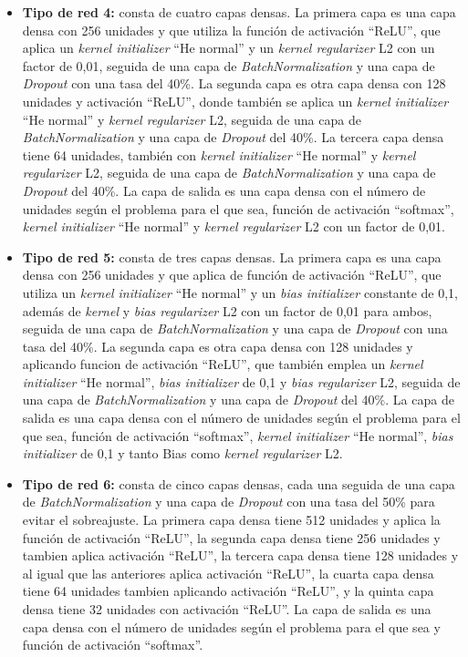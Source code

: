 \begin{itemize}
    \item \textbf{Tipo de red 4:} consta de cuatro capas densas. La primera capa es una capa densa con 256 unidades y que utiliza la función de activación ``ReLU'', que aplica un \textit{kernel initializer} ``He normal'' y un \textit{kernel regularizer} L2 con un factor de 0,01, seguida de una capa de \textit{BatchNormalization} y una capa de \textit{Dropout} con una tasa del 40\%. La segunda capa es otra capa densa con 128 unidades y activación ``ReLU'', donde también se aplica un \textit{kernel initializer} ``He normal'' y \textit{kernel regularizer} L2, seguida de una capa de \textit{BatchNormalization} y una capa de \textit{Dropout} del 40\%. La tercera capa densa tiene 64 unidades, también con \textit{kernel initializer} ``He normal'' y \textit{kernel regularizer} L2, seguida de una capa de \textit{BatchNormalization} y una capa de \textit{Dropout} del 40\%. La capa de salida es una capa densa con el número de unidades según el problema para el que sea, función de activación ``softmax'', \textit{kernel initializer} ``He normal'' y \textit{kernel regularizer} L2 con un factor de 0,01.
    \item \textbf{Tipo de red 5:} consta de tres capas densas. La primera capa es una capa densa con 256 unidades y que aplica de función de activación ``ReLU'', que utiliza un \textit{kernel initializer} ``He normal'' y un \textit{bias initializer} constante de 0,1, además de \textit{kernel} y \textit{bias regularizer} L2 con un factor de 0,01 para ambos, seguida de una capa de \textit{BatchNormalization} y una capa de \textit{Dropout} con una tasa del 40\%. La segunda capa es otra capa densa con 128 unidades y aplicando funcion de activación ``ReLU'', que también emplea un \textit{kernel initializer} ``He normal'', \textit{bias initializer} de 0,1 y \textit{bias regularizer} L2, seguida de una capa de \textit{BatchNormalization} y una capa de \textit{Dropout} del 40\%. La capa de salida es una capa densa con el número de unidades según el problema para el que sea, función de activación ``softmax'', \textit{kernel initializer} ``He normal'', \textit{bias initializer} de 0,1 y tanto Bias como \textit{kernel regularizer} L2.
    \item \textbf{Tipo de red 6:} consta de cinco capas densas, cada una seguida de una capa de \textit{BatchNormalization} y una capa de \textit{Dropout} con una tasa del 50\% para evitar el sobreajuste. La primera capa densa tiene 512 unidades y aplica la función de activación ``ReLU'', la segunda capa densa tiene 256 unidades y tambien aplica activación ``ReLU'', la tercera capa densa tiene 128 unidades y al igual que las anteriores aplica activación ``ReLU'', la cuarta capa densa tiene 64 unidades tambien aplicando activación ``ReLU'', y la quinta capa densa tiene 32 unidades con activación ``ReLU''. La capa de salida es una capa densa con el número de unidades según el problema para el que sea y función de activación ``softmax''.

\end{itemize}


